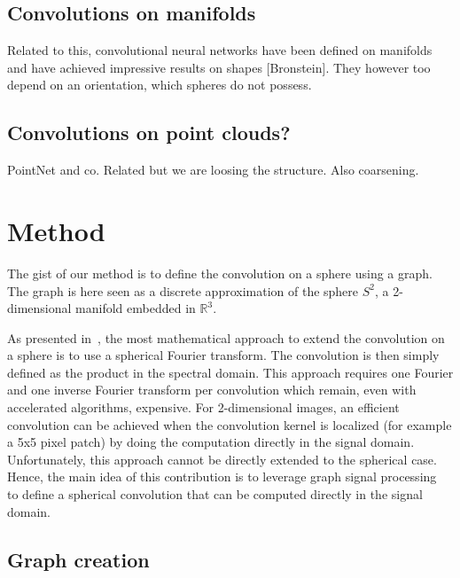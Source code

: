\documentclass[preprint,12pt,authoryear]{elsarticle}
\newcommand{\assign}[1]{{\color[rgb]{.8,.5,.8}{Assigned: #1 }}}
\begin{document}
\subsection{Convolutions on manifolds}

Related to this, convolutional neural networks have been defined on manifolds and have achieved impressive results on shapes [Bronstein]. They however too depend on an orientation, which spheres do not possess.

\subsection{Convolutions on point clouds?}

PointNet and co. Related but we are loosing the structure. Also coarsening.

\section{Method}

The gist of our method is to define the convolution on a sphere using a graph.
The graph is here seen as a discrete approximation of the sphere $S^2$, a
2-dimensional manifold embedded in $\mathbb{R}^3$.

As presented in~\cite{cohen2018spherical}, the most mathematical approach to
extend the convolution on a sphere is to use a spherical Fourier transform. The
convolution is then simply defined as the product in the spectral domain. This
approach requires one Fourier and one inverse Fourier transform per convolution
which remain, even with accelerated algorithms, expensive. For 2-dimensional
images, an efficient convolution can be achieved when the convolution kernel is
localized (for example a 5x5 pixel patch) by doing the computation directly in
the signal domain. Unfortunately, this approach cannot be directly extended to
the spherical case. Hence, the main idea of this contribution is to leverage
graph signal processing~\cite{shuman2013emerging} to define a spherical
convolution that can be computed directly in the signal domain.

\subsection{Graph creation}
\assign{Nathanaël}
\end{document}
